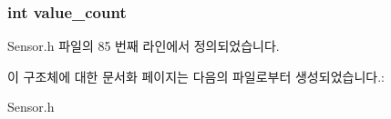 \hypertarget{struct___temperature__data_a40a079bfc72408819dc78da308203a74}{
\subsubsection[{value\-\_\-count}]{\setlength{\rightskip}{0pt plus 5cm}int value\-\_\-count}}\label{struct___temperature__data_a40a079bfc72408819dc78da308203a74}


Sensor.\-h 파일의 85 번째 라인에서 정의되었습니다.



이 구조체에 대한 문서화 페이지는 다음의 파일로부터 생성되었습니다.\-:\begin{DoxyCompactItemize}
\item 
Sensor.\-h\end{DoxyCompactItemize}
